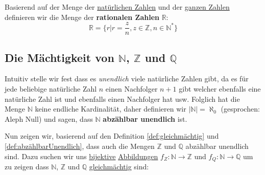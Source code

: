 \documentclass[../../main.tex]{subfiles}
\begin{document}
		\begin{definition}
			Basierend auf der Menge der \hyperref[def:NatürlicheZahlen]{natürlichen Zahlen} und der \hyperref[def:GanzeZahlen]{ganzen Zahlen} definieren wir die Menge der \textbf{rationalen Zahlen} $\mathbb{R}$: $$\mathbb{R} = \{r | r = \frac{z}{n}, z \in \mathbb{Z}, n \in \mathbb{N}^* \}$$
		\end{definition}
	
	

		
		
		\subsection*{Die Mächtigkeit von $\mathbb{N}$, $\mathbb{Z}$ und $\mathbb{Q}$}
		\begin{definition}
			\label{def:abzählbarUnendlich}
			Intuitiv stelle wir fest dass es \textit{unendlich} viele natürliche Zahlen gibt, da es für jede beliebige natürliche Zahl $n$ einen Nachfolger $n+1$ gibt welcher ebenfalls eine natürliche Zahl ist und ebenfalls einen Nachfolger hat usw. Folglich hat die Menge $\mathbb{N}$ keine endliche Kardinalität, daher definieren wir $|\mathbb{N}|=\aleph_0$ (gesprochen: Aleph Null) und sagen, dass $\mathbb{N}$ \textbf{abzählbar unendlich} ist. 
		\end{definition}
		
		Nun zeigen wir, basierend auf den Definition \ref{def:gleichmächtig} und \ref{def:abzählbarUnendlich}, dass auch die Mengen $\mathbb{Z}$ und $\mathbb{Q}$ abzählbar unendlich sind. Dazu suchen wir uns \hyperref[def:Bijektiv]{bijektive} \hyperref[def:Abbildung]{Abbildungen} $f_Z: \mathbb{N} \rightarrow \mathbb{Z}$ und $f_Q: \mathbb{N} \rightarrow \mathbb{Q}$ um zu zeigen dass $\mathbb{N}$, $\mathbb{Z}$ und $\mathbb{Q}$ \hyperref[def:gleichmächtig]{gleichmächtig} sind:
		
\end{document}
